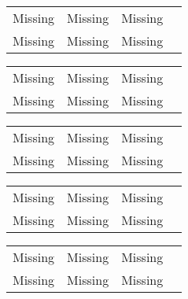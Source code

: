 \begin{minipage}{\columnwidth}
\begin{tabular}{lccc}
Missing & Missing & Missing \\
Missing & Missing & Missing \\
\end{tabular}
\end{minipage}

\begin{minipage}{\columnwidth}
\begin{tabular}{lccc}
Missing & Missing & Missing \\
Missing & Missing & Missing \\
\end{tabular}
\end{minipage}

\begin{minipage}{\columnwidth}
\begin{tabular}{lccc}
Missing & Missing & Missing \\
Missing & Missing & Missing \\
\end{tabular}
\end{minipage}

\begin{minipage}{\columnwidth}
\begin{tabular}{lccc}
Missing & Missing & Missing \\
Missing & Missing & Missing \\
\end{tabular}
\end{minipage}

\begin{minipage}{\columnwidth}
\begin{tabular}{lccc}
Missing & Missing & Missing \\
Missing & Missing & Missing \\
\end{tabular}
\end{minipage}

